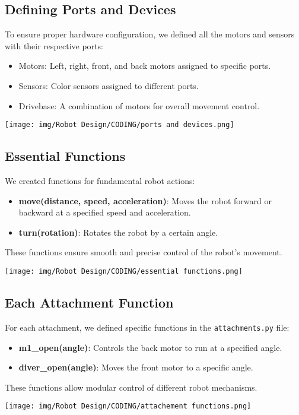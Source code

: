 \subsection{Defining Ports and Devices}
To ensure proper hardware configuration, we defined all the motors and sensors with their respective ports:
\begin{itemize}
    \item Motors: Left, right, front, and back motors assigned to specific ports.
    \item Sensors: Color sensors assigned to different ports.
    \item Drivebase: A combination of motors for overall movement control.
    
\end{itemize}
\vspace{1cm}
\begin{center}
  \texttt{[image: img/Robot Design/CODING/ports and devices.png]}
\end{center}
\vspace{1cm}


\subsection{Essential Functions}
We created functions for fundamental robot actions:
\begin{itemize}
    \item \textbf{move(distance, speed, acceleration)}: Moves the robot forward or backward at a specified speed and acceleration.
    \item \textbf{turn(rotation)}: Rotates the robot by a certain angle.
\end{itemize}
These functions ensure smooth and precise control of the robot's movement.

\vspace{1cm}
\begin{center}
  \texttt{[image: img/Robot Design/CODING/essential functions.png]}
\end{center}
\vspace{8cm}
\subsection{Each Attachment Function}
For each attachment, we defined specific functions in the \texttt{attachments.py} file:
\begin{itemize}
    \item \textbf{m1\_open(angle)}: Controls the back motor to run at a specified angle.
    \item \textbf{diver\_open(angle)}: Moves the front motor to a specific angle.
\end{itemize}
These functions allow modular control of different robot mechanisms.
\vspace{1cm}
\begin{center}
  \texttt{[image: img/Robot Design/CODING/attachement functions.png]}
\end{center}


